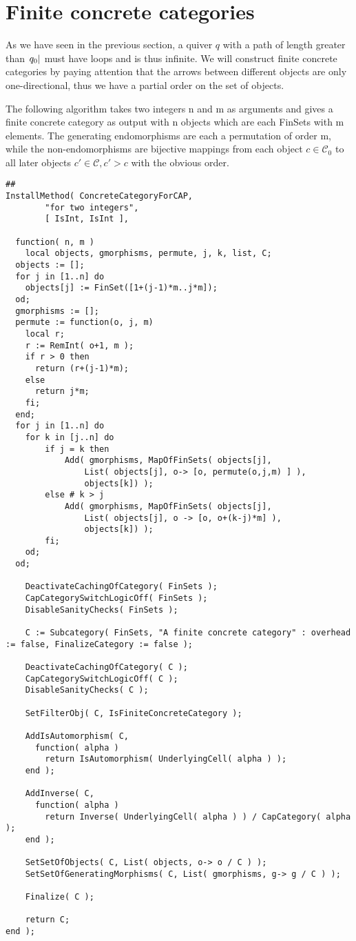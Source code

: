
\section{Finite concrete categories}

As we have seen in the previous section, a quiver $q$ with a path of length greater than $\abs{q_{0}}$ must have loops and is thus infinite.
We will construct finite concrete categories by paying attention that the arrows between different objects are only one-directional, thus we
have a partial order on the set of objects.

The following algorithm takes two integers n and m as arguments and gives a finite concrete category as output with n objects which are each
FinSets with m elements. The generating endomorphisms are each a permutation of order m, while the non-endomorphisms are bijective
mappings from each object $c \in \mathcal{C}_{0}$ to all later objects $c' \in \mathcal{C}, c' > c$ with the obvious order.

\begin{verbatim}
##
InstallMethod( ConcreteCategoryForCAP,
        "for two integers",
        [ IsInt, IsInt ],
        
  function( n, m )
	local objects, gmorphisms, permute, j, k, list, C;
  objects := [];
  for j in [1..n] do
    objects[j] := FinSet([1+(j-1)*m..j*m]);
  od;
  gmorphisms := [];
  permute := function(o, j, m)
    local r;
    r := RemInt( o+1, m );
    if r > 0 then
      return (r+(j-1)*m);
    else
      return j*m;
    fi;
  end;
  for j in [1..n] do
    for k in [j..n] do
		if j = k then
		    Add( gmorphisms, MapOfFinSets( objects[j], 
				List( objects[j], o-> [o, permute(o,j,m) ] ),
				objects[k]) );
		else # k > j
			Add( gmorphisms, MapOfFinSets( objects[j],
				List( objects[j], o -> [o, o+(k-j)*m] ),
				objects[k]) );
		fi;
	od;
  od;
  
    DeactivateCachingOfCategory( FinSets );
    CapCategorySwitchLogicOff( FinSets );
    DisableSanityChecks( FinSets );
    
    C := Subcategory( FinSets, "A finite concrete category" : overhead := false, FinalizeCategory := false );
	
	DeactivateCachingOfCategory( C );
    CapCategorySwitchLogicOff( C );
    DisableSanityChecks( C );
	
	SetFilterObj( C, IsFiniteConcreteCategory );
	
	AddIsAutomorphism( C,
      function( alpha )
        return IsAutomorphism( UnderlyingCell( alpha ) );
    end );
	
	AddInverse( C,
      function( alpha )
        return Inverse( UnderlyingCell( alpha ) ) / CapCategory( alpha );
    end );
	
	SetSetOfObjects( C, List( objects, o-> o / C ) );
	SetSetOfGeneratingMorphisms( C, List( gmorphisms, g-> g / C ) );
	
    Finalize( C );
    
    return C;
end );
\end{verbatim}